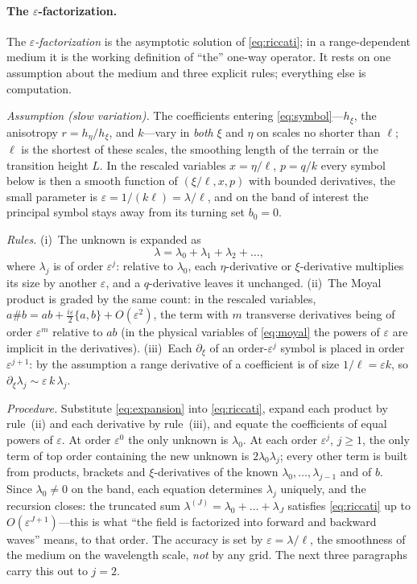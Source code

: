 \documentclass[11pt]{article}
\newcommand{\pd}{\partial}
\begin{document}
\paragraph{The $\varepsilon$-factorization.}
The \emph{$\varepsilon$-factorization} is the asymptotic solution of
\eqref{eq:riccati}; in a range-dependent medium it is the working definition
of ``the'' one-way operator. It rests on one assumption about the medium and
three explicit rules; everything else is computation.

\emph{Assumption (slow variation).} The coefficients entering
\eqref{eq:symbol}---$h_\xi$, the anisotropy $r=h_\eta/h_\xi$, and $k$---vary
in \emph{both} $\xi$ and $\eta$ on scales no shorter than $\ell$; $\ell$ is
the shortest of these scales, the smoothing length of the terrain or the
transition height $L$. In the rescaled variables $x=\eta/\ell$, $p=q/k$
every symbol below is then a smooth function of $(\xi/\ell,x,p)$ with
bounded derivatives, the small parameter is
$\varepsilon=1/(k\ell)=\lambda/\ell$, and on the band of interest the
principal symbol stays away from its turning set $b_0=0$.

\emph{Rules.}
(i)~The unknown is expanded as
\begin{equation}\label{eq:expansion}
\lambda=\lambda_0+\lambda_1+\lambda_2+\dots,
\end{equation}
where $\lambda_j$ is of order $\varepsilon^j$: relative to $\lambda_0$,
each $\eta$-derivative or $\xi$-derivative multiplies its size by another
$\varepsilon$, and a $q$-derivative leaves it unchanged.
(ii)~The Moyal product is graded by the same count: in the rescaled
variables,
$a\#b=ab+\tfrac{i\varepsilon}2\{a,b\}+O(\varepsilon^2)$, the term with $m$
transverse derivatives being of order $\varepsilon^m$ relative to $ab$ (in
the physical variables of \eqref{eq:moyal} the powers of $\varepsilon$ are
implicit in the derivatives).
(iii)~Each $\pd_\xi$ of an order-$\varepsilon^j$ symbol is placed in order
$\varepsilon^{j+1}$: by the assumption a range derivative of a coefficient
is of size $1/\ell=\varepsilon k$, so
$\pd_\xi\lambda_j\sim\varepsilon\,k\,\lambda_j$.

\emph{Procedure.} Substitute \eqref{eq:expansion} into
\eqref{eq:riccati}, expand each product by rule~(ii) and each derivative by
rule~(iii), and equate the coefficients of equal powers of $\varepsilon$.
At order $\varepsilon^0$ the only unknown is $\lambda_0$. At each order
$\varepsilon^j$, $j\ge1$, the only term of top order containing the new
unknown is $2\lambda_0\lambda_j$; every other term is built from products,
brackets and $\xi$-derivatives of the known $\lambda_0,\dots,\lambda_{j-1}$
and of $b$. Since $\lambda_0\neq0$ on the band, each equation determines
$\lambda_j$ uniquely, and the recursion closes: the truncated sum
$\lambda^{(J)}=\lambda_0+\dots+\lambda_J$ satisfies \eqref{eq:riccati} up
to $O(\varepsilon^{J+1})$---this is what ``the field is factorized into
forward and backward waves'' means, to that order. The accuracy is set by
$\varepsilon=\lambda/\ell$, the smoothness of the medium on the wavelength
scale, \emph{not} by any grid. The next three paragraphs carry this out to
$j=2$.
\end{document}
